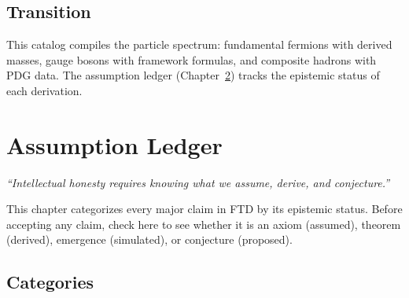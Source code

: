 \documentclass[
  11pt,
  letterpaper,
  twoside,
  openany]{book}
\makeatletter
\let\orig@section\section
\renewcommand{\section}{\needspace{8\baselineskip}\orig@section}
\makeatother
\begin{document}
\section{Transition}\label{transition}

This catalog compiles the particle spectrum: fundamental fermions with
derived masses, gauge bosons with framework formulas, and composite
hadrons with PDG data. The assumption ledger
(Chapter~\ref{sec-assumption-ledger}) tracks the epistemic status of
each derivation.

\chapter{Assumption Ledger}\label{sec-assumption-ledger}

\emph{``Intellectual honesty requires knowing what we assume, derive,
and conjecture.''}

\begin{tcolorbox}[enhanced jigsaw, colbacktitle=quarto-callout-important-color!10!white, titlerule=0mm, bottomtitle=1mm, bottomrule=.15mm, colback=white, arc=.35mm, breakable, toprule=.15mm, title=\textcolor{quarto-callout-important-color}{\faExclamation}\hspace{0.5em}{Purpose of This Chapter}, rightrule=.15mm, coltitle=black, leftrule=.75mm, colframe=quarto-callout-important-color-frame, toptitle=1mm, opacityback=0, opacitybacktitle=0.6, left=2mm]

This chapter categorizes every major claim in FTD by its epistemic
status. Before accepting any claim, check here to see whether it is an
axiom (assumed), theorem (derived), emergence (simulated), or conjecture
(proposed).

\end{tcolorbox}

\section{Categories}\label{categories}
\end{document}
